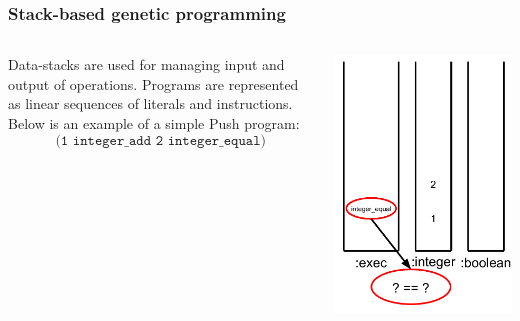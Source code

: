 \documentclass{beamer}
\newcommand{\linespace}{\vskip 0.25cm}
\begin{document}
\begin{frame}
	\frametitle{Stack-based genetic programming}
	\begin{columns}
		\begin{column}{0.65\textwidth}
			Data-stacks are used for managing input and output of operations.
			\linespace
			\linespace
			\linespace
			Programs are represented as linear sequences of literals and instructions. Below is an example of a simple Push program:
			\[\texttt{(1 integer\_add 2 integer\_equal)}\]
		\end{column}
		\begin{column}{0.35\textwidth}
			\includegraphics[height=.7\textheight]{Illustrations/stack_6.PDF}
		\end{column}
	\end{columns}
\end{frame}
\end{document}

